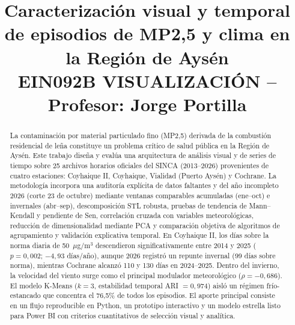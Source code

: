 \documentclass[conference]{IEEEtran}
\begin{document}
\title{Caracterizaci{\'o}n visual y temporal de episodios de MP2,5 y clima en la Regi{\'o}n de Ays{\'e}n\\
\vspace{4pt}\large\textbf{EIN092B VISUALIZACI{\'O}N -- Profesor: Jorge Portilla}}

\author{
\and
{}
}

\maketitle

\begin{abstract}
La contaminaci{\'o}n por material particulado fino (MP2,5) derivada de la combusti{\'o}n residencial de le{\~n}a constituye un problema cr{\'i}tico de salud p{\'u}blica en la Regi{\'o}n de Ays{\'e}n. Este trabajo dise{\~n}a y eval{\'u}a una arquitectura de an{\'a}lisis visual y de series de tiempo sobre 25 archivos horarios oficiales del SINCA (2013--2026) provenientes de cuatro estaciones: Coyhaique II, Coyhaique, Vialidad (Puerto Ays{\'e}n) y Cochrane. La metodolog{\'i}a incorpora una auditor{\'i}a expl{\'i}cita de datos faltantes y del a{\~n}o incompleto 2026 (corte 23 de octubre) mediante ventanas comparables acumuladas (ene--oct) e invernales (abr--sep), descomposici{\'o}n STL robusta, pruebas de tendencia de Mann--Kendall y pendiente de Sen, correlaci{\'o}n cruzada con variables meteorol{\'o}gicas, reducci{\'o}n de dimensionalidad mediante PCA y comparaci{\'o}n objetiva de algoritmos de agrupamiento y validaci{\'o}n explicativa temporal. En Coyhaique II, los d{\'i}as sobre la norma diaria de 50~$\mu$g/m$^3$ descendieron significativamente entre 2014 y 2025 ($p=0,002$; $-4,93$ d{\'i}as/a{\~n}o), aunque 2026 registr{\'o} un repunte invernal (99 d{\'i}as sobre norma), mientras Cochrane alcanz{\'o} 110 y 130 d{\'i}as en 2024--2025. Dentro del invierno, la velocidad del viento surge como el principal modulador meteorol{\'o}gico ($\rho=-0,686$). El modelo K-Means ($k=3$, estabilidad temporal ARI $=0,974$) aisl{\'o} un r{\'e}gimen fr{\'i}o-estancado que concentra el 76,5\% de todos los episodios. El aporte principal consiste en un flujo reproducible en Python, un prototipo interactivo y un modelo estrella listo para Power BI con criterios cuantitativos de selecci{\'o}n visual y anal{\'i}tica.
\end{abstract}
\end{document}
